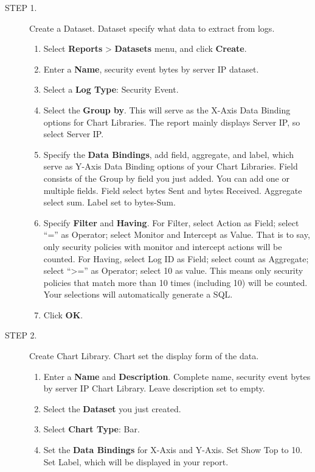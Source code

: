 \begin{description}
    \item[STEP 1.]	Create a Dataset. Dataset specify what data to extract from logs.
    \begin{enumerate}
        \item Select \textbf{Reports} > \textbf{Datasets} menu, and click \textbf{Create}.
        \item Enter a \textbf{Name}, security event bytes by server IP dataset.
        \item Select a \textbf{Log Type}: Security Event.
        \item Select the \textbf{Group by}. This will serve as the X-Axis Data Binding options for Chart Libraries. The report mainly displays Server IP, so select Server IP.
        \item Specify the \textbf{Data Bindings}, add field, aggregate, and label, which serve as Y-Axis Data Binding options of your Chart Libraries. Field consists of the Group by field you just added. You can add one or multiple fields. Field select bytes Sent and bytes Received. Aggregate select sum. Label set to bytes-Sum. 
        \item Specify \textbf{Filter} and \textbf{Having}. For Filter, select Action as Field; select “=” as Operator; select Monitor and Intercept as Value. That is to say, only security policies with monitor and intercept actions will be counted. For Having, select Log ID as Field; select count as Aggregate; select “>=” as Operator; select 10 as value. This means only security policies that match more than 10 times (including 10) will be counted. Your selections will automatically generate a SQL.
        \item Click \textbf{OK}.  
    \end{enumerate}
    \item[STEP 2.]	Create Chart Library. Chart set the display form of the data.
    \begin{enumerate}
        \item	Enter a \textbf{Name} and \textbf{Description}. Complete name, security event bytes by server IP Chart Library. Leave description set to empty. 
        \item	Select the \textbf{Dataset} you just created.
        \item	Select \textbf{Chart Type}: Bar. 
        \item	Set the \textbf{Data Bindings} for X-Axis and Y-Axis. Set Show Top to 10. Set Label, which will be displayed in your report.

\end{enumerate}
\end{description}
